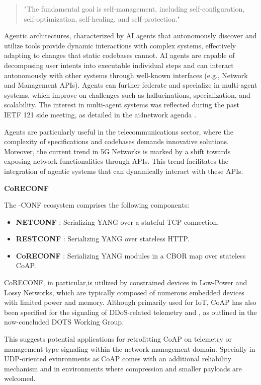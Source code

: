 \documentclass[11pt,sigconf]{iabart}
\begin{document}
\begin{quote}
"The fundamental goal is self-management, including self-configuration, self-optimization, self-healing, and self-protection." \cite{RFC7575}
\end{quote}

Agentic architectures, characterized by AI agents that autonomously discover and utilize tools provide dynamic interactions with complex systems, effectively adapting to changes that static codebases cannot. AI agents are capable of decomposing user intents into executable individual steps and can interact autonomously with other systems through well-known interfaces (e.g., Network and Management APIs). Agents can further federate and specialize in multi-agent systems, which improve on challenges such as hallucinations, specialization, and scalability. The interest in multi-agent systems was reflected during the past IETF 121 side meeting, as detailed in the ai4network agenda \cite{ai4network-agenda}. 

Agents are particularly useful in the telecommunications sector, where the complexity of specifications and codebases demands innovative solutions. Moreover, the current trend in 5G Networks is marked by a shift towards exposing network functionalities through APIs. This trend facilitates the integration of agentic systems that can dynamically interact with these APIs.

\textbf{CoRECONF}

The -CONF ecosystem comprises the following components:
\begin{itemize}
  \item \textbf{NETCONF} \cite{RFC6241}: Serializing YANG over a stateful TCP connection.    
  \item \textbf{RESTCONF} \cite{RFC8040}: Serializing YANG over stateless HTTP.
  \item \textbf{CoRECONF} \cite{draft-ietf-core-comi}: Serializing YANG modules in a CBOR \cite{RFC9254} map over stateless CoAP.
\end{itemize}

CoRECONF, in particular,is utilized by constrained devices in Low-Power and Lossy Networks, which are typically composed of numerous embedded devices with limited power and memory. Although primarily used for IoT, CoAP has also been specified for the signaling of DDoS-related telemetry \cite{RFC9132} and \cite{RFC9362}, as outlined in the now-concluded DOTS Working Group. 

This suggests potential applications for retrofitting CoAP on telemetry or management-type signaling within the network management domain. Specially in UDP-oriented evinronments as CoAP comes with an additional reliability mechanism and in environments where compression and smaller payloads are welcomed. 
\end{document}

